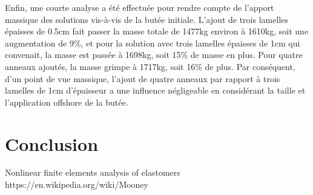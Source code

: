 ﻿\documentclass{article}
\begin{document}
Enfin, une courte analyse a été effectuée pour rendre compte de l'apport massique des solutions vis-à-vis de la butée initiale. L'ajout de trois lamelles épaisses de 0.5cm fait passer la masse totale de 1477kg environ à 1610kg, soit une augmentation de 9\%, et pour la solution avec trois lamelles épaisses de 1cm qui convenait, la masse est passée à 1698kg, soit 15\% de masse en plus. Pour quatre anneaux ajoutés, la masse grimpe à 1717kg, soit 16\% de plus. Par conséquent, d'un point de vue massique, l'ajout de quatre anneaux par rapport à trois lamelles de 1cm d'épaisseur a une influence négligeable en considérant la taille et l'application offshore de la butée.

\section{Conclusion}

\listoffigures

\begin{thebibliography}{9}
 Nonlinear finite elements analysis of elastomers
 https://en.wikipedia.org/wiki/Mooney%
\end{thebibliography}
\end{document}
